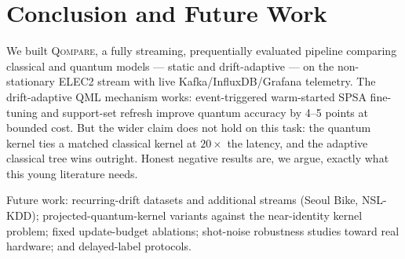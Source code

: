 \documentclass[conference]{IEEEtran}
\begin{document}
\section{Conclusion and Future Work}
\label{sec:concl}

We built \textsc{Qompare}, a fully streaming, prequentially evaluated pipeline comparing
classical and quantum models --- static and drift-adaptive --- on the non-stationary ELEC2
stream with live Kafka/InfluxDB/Grafana telemetry. The drift-adaptive QML mechanism works:
event-triggered warm-started SPSA fine-tuning and support-set refresh improve quantum
accuracy by 4--5 points at bounded cost. But the wider claim does not hold on this task:
the quantum kernel ties a matched classical kernel at $20\times$ the latency, and the
adaptive classical tree wins outright. Honest negative results are, we argue, exactly what
this young literature needs.

Future work: recurring-drift datasets and additional streams (Seoul Bike, NSL-KDD);
projected-quantum-kernel variants against the near-identity kernel problem; fixed
update-budget ablations; shot-noise robustness studies toward real hardware; and
delayed-label protocols.
\end{document}
